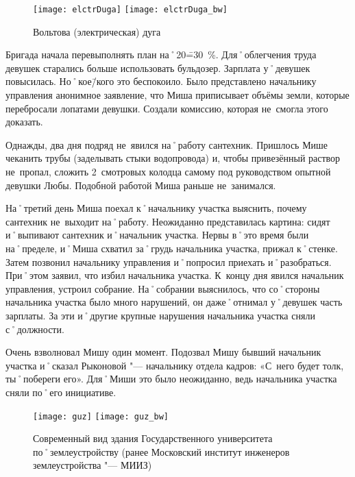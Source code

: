 \begin{wrapfigure}[15]{O}{.4\textwidth}
\centering
\ifPubTypeEBook
	\texttt{[image: elctrDuga]}
\else
	\texttt{[image: elctrDuga\_bw]}
\fi
\caption{Вольтова (электрическая) дуга}
\label{fig:elctrDuga}
\end{wrapfigure}

Бригада начала перевыполнять план на˚20\==30~\%. Для˚облегчения труда девушек старались больше использовать бульдозер. Зарплата у˚девушек повысилась. Но˚кое\=/кого это беспокоило. Было представлено начальнику управления анонимное заявление, что Миша приписывает объёмы земли, которые перебросали лопатами девушки. Создали комиссию, которая не~смогла этого доказать.

Однажды, два дня подряд не~явился на˚работу сантехник. Пришлось Мише чеканить трубы (заделывать стыки водопровода) и, чтобы привезённый раствор не~пропал, сложить 2~смотровых колодца самому под руководством опытной девушки Любы. Подобной работой Миша раньше не~занимался.

На˚третий день Миша поехал к˚начальнику участка выяснить, почему сантехник не~выходит на˚работу. Неожиданно представилась картина: сидят и˚выпивают сантехник и˚начальник участка. Нервы в˚это время были на˚пределе, и˚Миша схватил за˚грудь начальника участка, прижал к˚стенке. Затем позвонил начальнику управления и˚попросил приехать и˚разобраться. При˚этом заявил, что избил начальника участка. К~концу дня явился начальник управления, устроил собрание. На˚собрании выяснилось, что со˚стороны начальника участка было много нарушений, он даже˚отнимал у˚девушек часть зарплаты. За эти и˚другие крупные нарушения начальника участка сняли с˚должности. 

Очень взволновал Мишу один момент. Подозвал Мишу бывший начальник участка и˚сказал Рыконовой "--- начальнику отдела кадров: «С~него будет толк, ты˚побереги его». Для˚Миши это было неожиданно, ведь начальника участка сняли по˚его инициативе. 

\begin{wrapfigure}{O}{.4\textwidth}
\centering
\ifPubTypeEBook
	\texttt{[image: guz]}
\else
	\texttt{[image: guz\_bw]}
\fi
\caption[Современный вид здания Государственного университета по˚землеустройству (Ранее Московский институт инженеров землеустройства "--- МИИЗ)]{Современный вид здания Государственного университета по˚землеустройству (ранее Московский институт инженеров землеустройства "--- МИИЗ)\footnotemark}
\label{fig:guz}
\end{wrapfigure}

